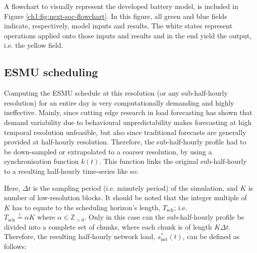 

A flowchart to visually represent the developed battery model, is included in Figure \ref{ch1:fig:next-soc-flowchart}.
In this figure, all green and blue fields indicate, respectively, model inputs and results.
The white states represent operations applied onto those inputs and results and in the end yield the output, i.e. the yellow field.



\subsection{ESMU scheduling}
\label{ch1:subsec:esmu-scheduling}

Computing the ESMU schedule at this resolution (or any sub-half-hourly resolution) for an entire day is very computationally demanding and highly ineffective.
Mainly, since cutting edge research in load forecasting has shown that demand variability due to behavioural unpredictability makes forecasting at high temporal resolution unfeasible, but also since traditional forecasts are generally provided at half-hourly resolution.
Therefore, the sub-half-hourly profile had to be down-sampled or extrapolated to a coarser resolution, by using a synchronisation function $k(t)$.
This function links the original sub-half-hourly to a resulting half-hourly time-series like so:




Here, $\Delta t$ is the sampling period (i.e. minutely period) of the simulation, and $K$ is number of low-resolution blocks.
It should be noted that the integer multiple of $K$ has to equate to the scheduling horizon's length, $T_\text{sch}$; i.e. $T_\text{sch} \overset{!}{=} \alpha K \text{ where } \alpha \in \mathbb{Z}_{>0}$.
Only in this case can the sub-half-hourly profile be divided into a complete set of chunks, where each chunk is of length $K\Delta t$.
Therefore, the resulting half-hourly network load, $s^{*}_\text{net}(t)$, can be defined as follows:

